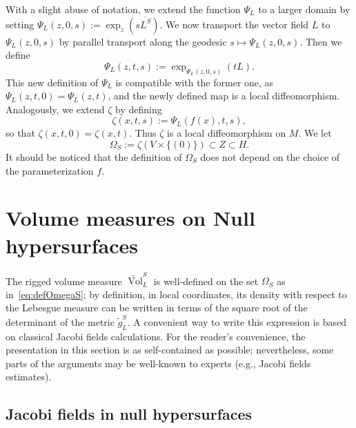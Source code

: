 \documentclass[12pt,a4paper]{amsart}
\theoremstyle{plain}
\theoremstyle{definition}
\numberwithin{equation}{section}
\DeclareMathOperator{\vol}{Vol}
\newcommand{\gflow}{\Psi}
\newcommand{\lparam}{\zeta}
\begin{document}
With a slight abuse of notation, we extend the function $\gflow_L$ to a
larger domain by setting $\gflow_L(z,0,s):=\exp_z(s\overline{L^S}).$
%
We now transport the vector field $L$ to $\gflow_L(z,0,s)$ by parallel
transport along the geodesic $s\mapsto \gflow_L(z,0,s)$.
%
Then we define 
$$\gflow_L(z,t,s):=\exp_{\gflow_L(z,0,s)}(tL).$$
%
This new definition of $\gflow_L$ is compatible with the former one, as
$\gflow_L(z,t,0)=\gflow_L(z,t)$, and the newly defined map is a local
diffeomorphism.
%
Analogously, we extend $\lparam$ by defining 
\begin{equation}\label{eq:paramM}
\lparam(x,t,s):=\gflow_L(f(x),t,s),
\end{equation}
so that $\lparam(x,t,0)=\lparam(x,t)$.
%
Thus $\lparam$ is  a local diffeomorphism on $M$. We let 
\begin{equation}\label{eq:defOmegaS}
\Omega_S:=\lparam(V\times\{(0)\})\subset Z \subset H.
\end{equation}
It should be noticed that the definition of $\Omega_S$ does not depend
on the choice of the parameterization $f$. 



\section{Volume measures on Null hypersurfaces}

\label{S:volume}

The rigged volume measure $\tilde{\vol}_L^S$ is well-defined on the set $\Omega_S$ as in~\eqref{eq:defOmegaS}; by definition, in local coordinates,  
its density with respect to the Lebesgue measure can be written  in terms of the square root of the determinant of the metric $\tilde g_{L}^{S}$.
A convenient way to write this expression is based on classical 
Jacobi fields calculations. 
%
 For the reader's convenience, the presentation 
in this section is as self-contained as
possible; nevertheless, some parts of the arguments may be well-known
to experts (e.g., Jacobi fields estimates).



\subsection{Jacobi fields in null hypersurfaces}
\label{S:jacobi}
\end{document}
